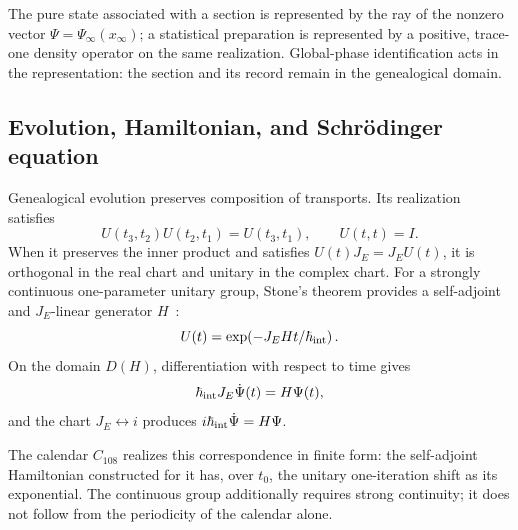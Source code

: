 \begin{principle}
\label{v:v:rec:realizacion_evolucion:statement:02}
The pure state associated with a section is represented by the ray of the
nonzero vector \(\Psi=\Psi_\infty(x_\infty)\); a statistical preparation is
represented by a positive, trace-one density operator on the same
realization. Global-phase identification acts in the representation:
the section and its record remain in the genealogical domain.
\end{principle}

\subsection{Evolution, Hamiltonian, and Schrödinger equation}
\label{v:v:rec:realizacion_evolucion:section:03}

Genealogical evolution preserves composition of transports. Its
realization satisfies
\[
 U(t_3,t_2)U(t_2,t_1)=U(t_3,t_1),
 \qquad U(t,t)=I.
\]
When it preserves the inner product and satisfies
\(U(t)J_E=J_EU(t)\), it is orthogonal in the real chart and unitary in the
complex chart. For a strongly continuous one-parameter unitary group,
Stone's theorem provides a self-adjoint and \(J_E\)-linear
generator \(H\)~\cite{v:Stone1932}:
\[
 U(t)=\exp\!\left(-J_E H t/\hbar_{\rm int}\right).
\]
On the domain \(D(H)\), differentiation with respect to time gives
\begin{equation}
 \hbar_{\rm int}J_E\dot\Psi(t)=H\Psi(t),
 \label{v:v:rec:eq:schrodinger-genealogico-rev2}
\end{equation}
and the chart \(J_E\leftrightarrow i\) produces
\(i\hbar_{\rm int}\dot\Psi=H\Psi\).

The calendar \(C_{108}\) realizes this correspondence in finite form:
the self-adjoint Hamiltonian constructed for it has, over \(t_0\),
the unitary one-iteration shift as its exponential. The
continuous group additionally requires strong continuity; it does not follow
from the periodicity of the calendar alone.
